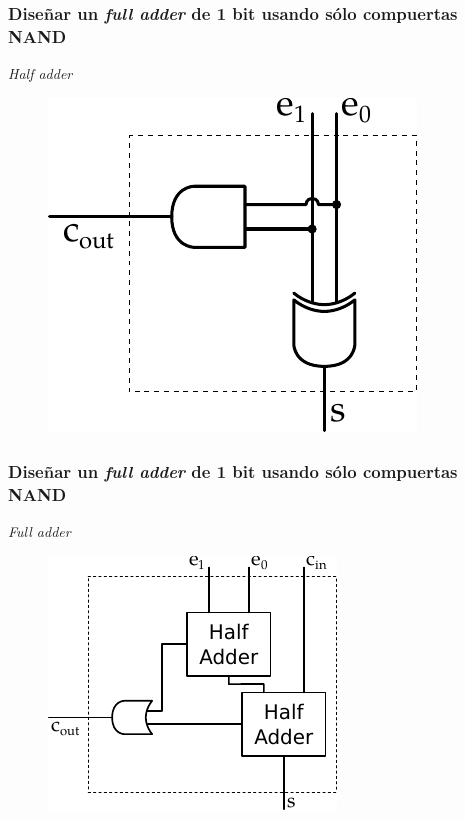 \documentclass[mathserif,hyperref={pdfpagelabels=false}]{beamer}
\begin{document}
\begin{frame}
\frametitle{\small Diseñar un \textit{full adder} de 1 bit usando sólo
compuertas NAND}
\textit{Half adder}
\begin{figure}[htp]
  \includegraphics[scale=0.9]{halfadder.pdf}
\end{figure}
\end{frame}


\begin{frame}
\frametitle{\small Diseñar un \textit{full adder} de 1 bit usando sólo
compuertas NAND}
\textit{Full adder}
\begin{figure}[htp]
  \includegraphics[scale=0.9]{fulladder.pdf}
\end{figure}
\end{frame}
\end{document}

